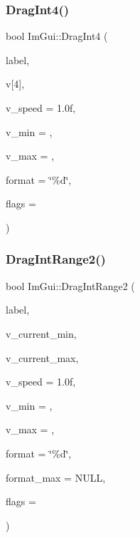 \subsubsection{\texorpdfstring{Drag\+Int4()}{DragInt4()}}
{\footnotesize\ttfamily bool Im\+Gui\+::\+Drag\+Int4 (\begin{DoxyParamCaption}\item[{const char $\ast$}]{label,  }\item[{int}]{v\mbox{[}4\mbox{]},  }\item[{float}]{v\+\_\+speed = {\ttfamily 1.0f},  }\item[{int}]{v\+\_\+min = {},  }\item[{int}]{v\+\_\+max = {},  }\item[{const char $\ast$}]{format = {\ttfamily \char`\"{}\%d\char`\"{}},  }\item[{Im\+Gui\+Slider\+Flags}]{flags = {} }\end{DoxyParamCaption})}

\mbox{\label{namespaceImGui_a27a0380e0480671c7cd854dd7bfc6bd1}} 
\subsubsection{\texorpdfstring{Drag\+Int\+Range2()}{DragIntRange2()}}
{\footnotesize\ttfamily bool Im\+Gui\+::\+Drag\+Int\+Range2 (\begin{DoxyParamCaption}\item[{const char $\ast$}]{label,  }\item[{int $\ast$}]{v\+\_\+current\+\_\+min,  }\item[{int $\ast$}]{v\+\_\+current\+\_\+max,  }\item[{float}]{v\+\_\+speed = {\ttfamily 1.0f},  }\item[{int}]{v\+\_\+min = {},  }\item[{int}]{v\+\_\+max = {},  }\item[{const char $\ast$}]{format = {\ttfamily \char`\"{}\%d\char`\"{}},  }\item[{const char $\ast$}]{format\+\_\+max = {\ttfamily NULL},  }\item[{Im\+Gui\+Slider\+Flags}]{flags = {} }\end{DoxyParamCaption})}

\mbox{\label{namespaceImGui_a17d8926e8f44a6d00575b12081c51fe0}} 

